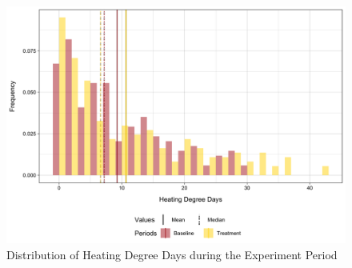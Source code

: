     \begin{figure}[t!]
        \centering
        \includegraphics[scale = 0.155]{03_Chapter-2/00A_Figures/Figure_Distribution-of-HDDs.png}
        \caption{Distribution of Heating Degree Days during the Experiment Period}
        \label{Figure:Distribution-of-Heating-Degree-Days-during-the-Experiment-Period}
    \end{figure}
\hspace{0.3cm}



